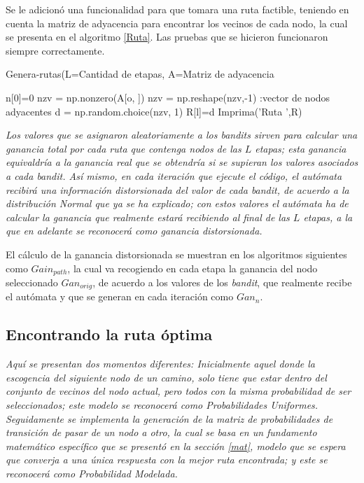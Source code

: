 Se le adicionó una funcionalidad para que tomara una ruta factible, teniendo en cuenta la matriz de adyacencia para encontrar los vecinos de cada nodo, la cual se presenta en el algoritmo \ref{Ruta}. Las pruebas que se hicieron funcionaron siempre correctamente.

\begin{algorithm} [h]
\caption{Genera-rutas(L=Cantidad de etapas, A=Matriz de adyacencia} 
\label{Ruta}
\begin{algorithmic}[1]
\STATE n[0]=0
    \STATE nzv = np.nonzero(A[o, ])
    \STATE nzv = np.reshape(nzv,-1) :vector de nodos adyacentes
        \STATE d = np.random.choice(nzv, 1)
        \STATE R[l]=d
    \ENDFOR   
\ENDFOR
\STATE Imprima('Ruta ',R)
\end{algorithmic}
\end{algorithm}

\textit{Los valores que se asignaron aleatoriamente a los \textit{bandits} sirven para calcular una ganancia total por cada ruta que contenga nodos de las $L$ etapas; esta ganancia equivaldría a la \textit{ganancia real} que se obtendría si se supieran los valores asociados a cada \textit{bandit}. Así mismo, en cada iteración que ejecute el código, el autómata recibirá una información distorsionada del valor de cada \textit{bandit}, de acuerdo a la distribución Normal que ya se ha explicado; con estos valores el autómata ha de calcular la ganancia que realmente estará recibiendo al final de las $L$ etapas, a la que en adelante se reconocerá como \textit{ganancia distorsionada}. }

El cálculo de la ganancia distorsionada se muestran en los algoritmos siguientes como $Gain_{path}$, la cual va recogiendo en cada etapa la ganancia del nodo seleccionado $Gan_{orig}$, de acuerdo a los valores de los \textit{bandit}, que realmente recibe el autómata y que se generan en cada iteración como $Gan_{n}$.

\subsection{Encontrando la ruta óptima}

\textit{Aquí se presentan dos momentos diferentes: Inicialmente aquel donde la escogencia del siguiente nodo de un camino, solo tiene que estar dentro del conjunto de vecinos del nodo actual, pero todos con la misma probabilidad de ser seleccionados; este modelo se reconocerá como Probabilidades Uniformes. Seguidamente se implementa la generación de la matriz de probabilidades de transición de pasar de un nodo a otro, la cual se basa en un fundamento matemático específico que se presentó en la sección \ref{mat}, modelo que se espera que converja a una única respuesta con la mejor ruta encontrada; y este se reconocerá como Probabilidad Modelada.}

